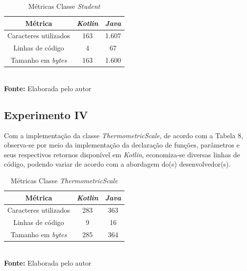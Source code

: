 \FloatBarrier
\begin{table}[!htbp]
\centering
\caption{Métricas Classe \textit{Student}}
	\begin{tabular}{ c | c | c }
		\hline
          \textbf{Métrica} &          \textbf{\textit{Kotlin}}    & \textbf{\textit{Java}}  \\ \hline
		
		  Caracteres utilizados   &     163 	      &          1.607      \\ \hline
		             
		  Linhas de código        &     4             &            67      \\ \hline
		             
		  Tamanho em \textit{bytes}        &     163           &          1.600     \\ \hline
		  
	\end{tabular}
	\\ \vspace{0.2cm}
	\textbf{Fonte:} Elaborada pelo autor
	\label{tab:exemplo}
\end{table}
\FloatBarrier

\subsection{Experimento IV}

Com a implementação da classe \textit{ThermometricScale}, de acordo com a Tabela 8, observa-se por meio da implementação da declaração de funções, parâmetros e seus respectivos retornos disponível em \textit{Kotlin}, economiza-se diversas linhas de código, podendo variar de acordo com a abordagem do(s) desenvolvedor(s).

\FloatBarrier
\begin{table}[!htbp]
\centering
\caption{Métricas Classe \textit{ThermometricScale}}
	\begin{tabular}{ c | c | c }
		\hline
          \textbf{Métrica} &          \textbf{\textit{Kotlin}}    & \textbf{\textit{Java}}  \\ \hline
		
		  Caracteres utilizados   &     283 	      &          363      \\ \hline
		             
		  Linhas de código        &     9             &           16      \\ \hline
		             
		  Tamanho em \textit{bytes}        &     285           &          364      \\ \hline
		  
	\end{tabular}
	\\ \vspace{0.2cm}
	\textbf{Fonte:} Elaborada pelo autor
	\label{tab:exemplo}
\end{table}
\FloatBarrier

